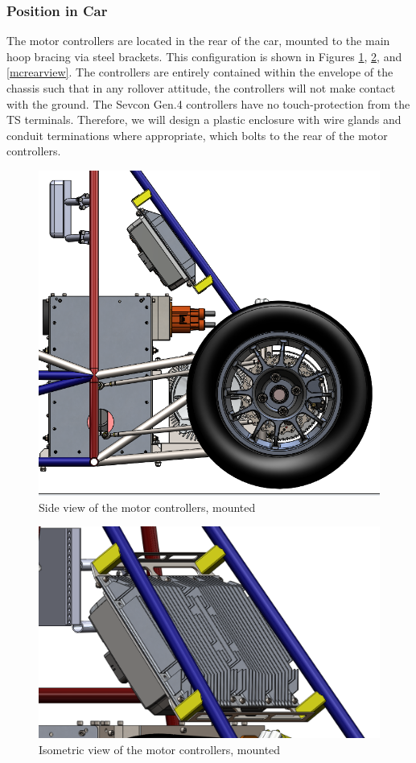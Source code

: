 \documentclass{article}
\begin{document}
        \subsubsection{Position in Car}

            The motor controllers are located in the rear of the car, mounted to the main hoop bracing via steel brackets. This configuration is shown in Figures \ref{mcsideview}, \ref{mciso}, and \ref{mcrearview}. The controllers are entirely contained within the envelope of the chassis such that in any rollover attitude, the controllers will not make contact with the ground. The Sevcon Gen.4 controllers have no touch-protection from the TS terminals. Therefore, we will design a plastic enclosure with wire glands and conduit terminations where appropriate, which bolts to the rear of the motor controllers.

            \begin{figure}[H]
                \centering
                \includegraphics[width = 0.6 \textwidth]{motorcontroller_sideview}
                \caption{Side view of the motor controllers, mounted}
                \label{mcsideview}
            \end{figure}

            \begin{figure}[H]
                \centering
                \includegraphics[width = 0.6 \textwidth]{motorcontroller_isoview}
                \caption{Isometric view of the motor controllers, mounted}
                \label{mciso}
            \end{figure}
\end{document}
